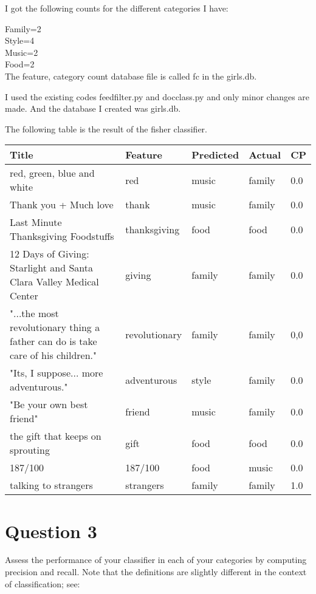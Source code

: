 \documentclass[letterpaper,11pt]{article}
\begin{document}
I got the following counts for the different categories I have:

Family=2\\
Style=4\\
Music=2\\
Food=2\\

The feature, category count database file is called fc in the girls.db.

I used the existing codes feedfilter.py and docclass.py and only minor changes are made. And the database I created was girls.db.

The following table is the result of the fisher classifier.

\begin{table}[htbp]
        \centering
\begin{tabular}{|p{8cm}|l|l|l|l|}
\hline
Title & Feature & Predicted & Actual & CP\\ \hline
    \hline
red, green, blue and white & red  & music & family & 0.0\\ \hline
Thank you + Much love & thank & music & family & 0.0 \\ \hline
Last Minute Thanksgiving Foodstuffs & thanksgiving & food & food & 0.0 \\ \hline
12 Days of Giving: Starlight and Santa Clara Valley Medical Center & giving & family & family & 0.0 \\ \hline
"...the most revolutionary thing a father can do is take care of his children." & revolutionary & family & family & 0,0 \\ \hline
"Its, I suppose... more adventurous." &adventurous&style&family &0.0 \\ \hline
"Be your own best friend" & friend & music & family & 0.0 \\ \hline
the gift that keeps on sprouting & gift & food & food & 0.0\\ \hline
187/100 & 187/100 & food & music & 0.0\\ \hline 
talking to strangers & strangers & family & family & 1.0\\ \hline

\end{tabular}
\label{tab:results}
\end{table}



\newpage
\section*{Question 3}
Assess the performance of your classifier in each of your categories by computing precision and recall.  Note that the definitions are slightly different in the context of classification;
see:
\end{document}
